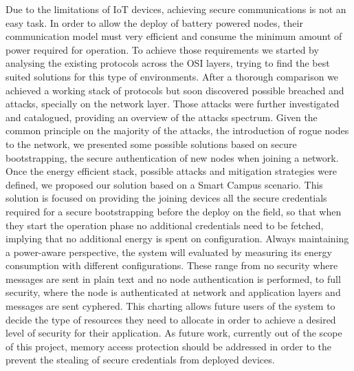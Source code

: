 Due to the limitations of \ac{IoT} devices, achieving secure communications is not an easy task. In order to allow the deploy of battery powered nodes, their communication model must very efficient and consume the minimum amount of power required for operation. To achieve those requirements we started by analysing the existing protocols across the OSI layers, trying to find the best suited solutions for this type of environments. After a thorough comparison we achieved a working stack of protocols but soon discovered possible breached and attacks, specially on the network layer. Those attacks were further investigated and catalogued, providing an overview of the attacks spectrum. Given the common principle on the majority of the attacks, the introduction of rogue nodes to the network, we presented some possible solutions based on secure bootstrapping, the secure authentication of new nodes when joining a network.
Once the energy efficient stack, possible attacks and mitigation strategies were defined, we proposed our solution based on a Smart Campus scenario. This solution is focused on providing the joining devices all the secure credentials required for a secure bootstrapping before the deploy on the field, so that when they start the operation phase no additional credentials need to be fetched, implying that no additional energy is spent on configuration.
Always maintaining a power-aware perspective, the system will evaluated by measuring its energy consumption with different configurations. These range from no security where messages are sent in plain text and no node authentication is performed, to full security, where the node is authenticated at network and application layers and messages are sent cyphered. This charting allows future users of the system to decide the type of resources they need to allocate in order to achieve a desired level of security for their application. As future work, currently out of the scope of this project, memory access protection should be addressed in order to the prevent the stealing of secure credentials from deployed devices.